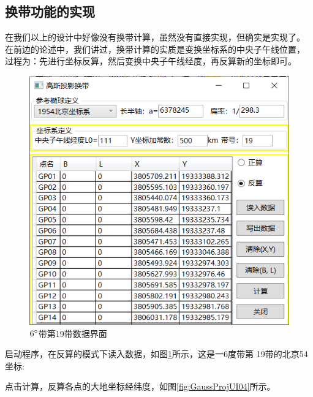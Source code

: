 \subsection{换带功能的实现}

在我们以上的设计中好像没有换带计算，虽然没有直接实现，但确实是实现了。
在前边的论述中，我们讲过，换带计算的实质是变换坐标系的中央子午线位置，
过程为：先进行坐标反算，然后变换中央子午线经度，再反算新的坐标即可。

\begin{figure}[htbp]
    \centering
    \includegraphics[scale=0.8]{gaussProj/UI03.png}
    \caption{$6^\circ$带第19带数据界面}
    \label{fig:GaussProjUI03}
\end{figure}

启动程序，在反算的模式下读入数据，如图\ref{fig:GaussProjUI03}所示，这是一6度带第
19带的北京54坐标:

点击计算，反算各点的大地坐标经纬度，如图\ref{fig:GaussProjUI04}所示。


